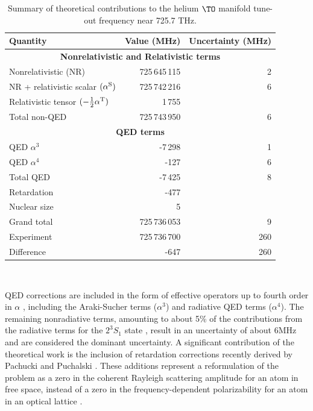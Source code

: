 	\begin{table}[t]
	\centering
	\begin{tabular}{l r r}
	Quantity    &Value (MHz) & Uncertainty (MHz) \\
	\hline
	\multicolumn{3}{c}{\textbf{Nonrelativistic and Relativistic terms}} \\
	Nonrelativistic (NR) & 725\,645\,115& 2       \\
	NR + relativistic scalar $(\alpha^{\rm S})$    & 725\,742\,216&6   \\
	Relativistic tensor $(-\frac12\alpha^{\rm T})$ &   1\,755& \\
	\hline
	Total non-QED        & 725\,743\,950&6     \\
	\hline
	\multicolumn{3}{c}{\textbf{QED terms}} \\
	QED $\alpha^3$       &       -7\,298& 1       \\
	QED $\alpha^4$       &          -127& 6       \\
	\hline
	Total QED            &         -7\,425& 8     \\
	\hline
	Retardation          &          -477 &        \\
	Nuclear size         &             5&          \\
	\hline
	Grand total          & 725\,736\,053& 9       \\
	Experiment           & 725\,736\,700& 260 \\
	\hline
	Difference           &          -647& 260\\
	\end{tabular}\\
	\caption{\label{tab:theory}Summary of theoretical contributions to the helium $\TO$ manifold tune-out frequency near 725.7 THz.}
	\end{table}
	QED corrections are included in the form of effective operators up to fourth order in $\alpha$ \cite{Yerokhin10}, including the Araki-Sucher terms \cite{Araki57,Sucher58} ($\alpha^3$) and radiative QED terms ($\alpha^4$). The remaining nonradiative terms, amounting to about 5\% of the contributions from the radiative terms for the $2^3S_1$ state \cite{Piszczatowski2015,Pachucki2006}, result in an uncertainty of about 6MHz and are considered the dominant uncertainty.	A significant contribution of the theoretical work is the inclusion of retardation corrections recently derived by Pachucki and Puchalski \cite{Pachucki19,Drake19}.  These additions represent a reformulation of the problem as a zero in the coherent Rayleigh scattering amplitude for an atom in free space, instead of a zero in the frequency-dependent polarizability for an atom in an optical lattice \cite{Pachucki19,Drake19}. 


